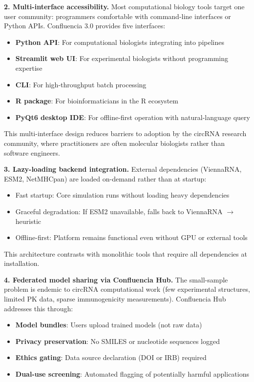 \documentclass[12pt]{article}
\begin{document}
\textbf{2. Multi-interface accessibility.} Most computational biology tools target one user community: programmers comfortable with command-line interfaces or Python APIs. Confluencia 3.0 provides five interfaces:

\begin{itemize}
\item \textbf{Python API}: For computational biologists integrating into pipelines
\item \textbf{Streamlit web UI}: For experimental biologists without programming expertise
\item \textbf{CLI}: For high-throughput batch processing
\item \textbf{R package}: For bioinformaticians in the R ecosystem
\item \textbf{PyQt6 desktop IDE}: For offline-first operation with natural-language query
\end{itemize}

This multi-interface design reduces barriers to adoption by the circRNA research community, where practitioners are often molecular biologists rather than software engineers.

\textbf{3. Lazy-loading backend integration.} External dependencies (ViennaRNA, ESM2, NetMHCpan) are loaded on-demand rather than at startup:

\begin{itemize}
\item Fast startup: Core simulation runs without loading heavy dependencies
\item Graceful degradation: If ESM2 unavailable, falls back to ViennaRNA $\rightarrow$ heuristic
\item Offline-first: Platform remains functional even without GPU or external tools
\end{itemize}

This architecture contrasts with monolithic tools that require all dependencies at installation.

\textbf{4. Federated model sharing via Confluencia Hub.} The small-sample problem is endemic to circRNA computational work (few experimental structures, limited PK data, sparse immunogenicity measurements). Confluencia Hub addresses this through:

\begin{itemize}
\item \textbf{Model bundles}: Users upload trained models (not raw data)
\item \textbf{Privacy preservation}: No SMILES or nucleotide sequences logged
\item \textbf{Ethics gating}: Data source declaration (DOI or IRB) required
\item \textbf{Dual-use screening}: Automated flagging of potentially harmful applications
\end{itemize}
\end{document}
